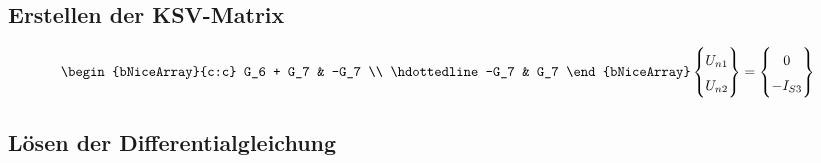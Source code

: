 \documentclass[11pt]{scrartcl}
\begin{document}
\subsection{Erstellen der KSV-Matrix}
\begin{align*}
  \renewcommand{\arraystretch}{1.5}
  \begin{bNiceArray}{c:c}
    G_6 + G_7 & -G_7 \\
    \hdottedline
    -G_7 & G_7
  \end{bNiceArray}
                            \begin{Bmatrix}
                              U_{n1} \\
                              U_{n2} \\
                            \end{Bmatrix} =
  \begin{Bmatrix}
    0 \\
    -I_{S3}
  \end{Bmatrix}
\end{align*}

\subsection{Lösen der Differentialgleichung}
\end{document}
